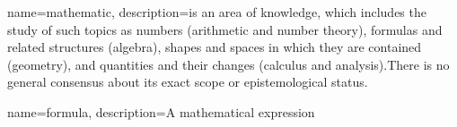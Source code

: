 {
        name=mathematic,
        description={is an area of knowledge, which includes the study of such topics as numbers (arithmetic and number theory), formulas and related structures (algebra), shapes and spaces in which they are contained (geometry), and quantities and their changes (calculus and analysis).There is no general consensus about its exact scope or epistemological status.}
}

{
        name=formula,
        description={A mathematical expression}
}


